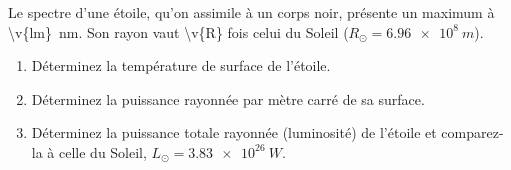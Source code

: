 Le spectre d'une étoile, qu'on assimile à un corps noir, présente un maximum à \qty{\v{lm}}{nm}. Son rayon vaut \num{\v{R}} fois celui du Soleil ($R_\odot = \qty{6.96e8}{m}$).

\begin{enumerate}[label=\alph*)]
    \item Déterminez la température de surface de l'étoile.
    \item Déterminez la puissance rayonnée par mètre carré de sa surface.
    \item Déterminez la puissance totale rayonnée (luminosité) de l'étoile et comparez-la à celle du Soleil, $L_\odot = \qty{3.83e26}{W}$.
\end{enumerate}

